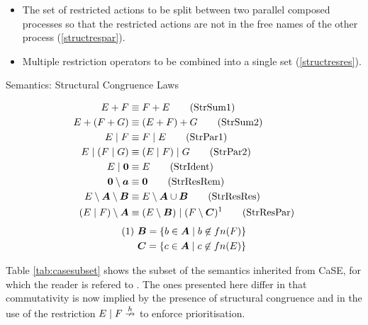 \documentclass[orivec,envcountsame]{llncs}
\begin{document}
\begin{itemize}
\item The set of restricted actions to be split between two parallel
      composed processes so that the restricted actions are not in the
      free names of the other process \textsf{(\ref{structrespar})}.
\item Multiple restriction operators to be combined into a single set
      \textsf{(\ref{structresres})}.
\end{itemize}

\begin{table}
  \caption{Semantics: Structural Congruence Laws}
 \label{tab:structcong}
 \vspace{-3mm}
  \shrule
  \begin{align}
   E + F & \equiv F + E \tag{StrSum1} \label{structsum1}
  \\
   E + (F + G) & \equiv (E + F) + G \tag{StrSum2} \label{structsum2}
   \\
    E \pc F & \equiv F \pc E \tag{StrPar1} \label{structpar1}
  \\
   E \pc (F \pc G) & \equiv (E \pc F) \pc G \tag{StrPar2} \label{structpar2}
 \\
    E \pc \nil & \equiv E \tag{StrIdent} \label{structident}
   \\
    \nil \setminus \vec{a} & \equiv \nil \tag{StrResRem}
   \label{structresremove}
   \\
    E \setminus \vec{A} \setminus \vec{B} & \equiv E \setminus \vec{A} \cup \vec{B}
   \tag{StrResRes} \label{structresres}
   \\
    (E \pc F) \setminus \vec{A} & \equiv (E \setminus \vec{B}) \pc (F
   \setminus \vec{C})^1 \tag{StrResPar} \label{structrespar}
\end{align}
\begin{align} 
   (1)\ & \vec{B} = \{b \in \vec{A} \pc b \not \in fn(F)\} \notag \\ 
   & \vec{C} = \{c \in \vec{A} \pc c \not \in fn(E)\} \notag
 \end{align} 
  \shrule
\end{table}

Table \ref{tab:casesubset} shows the subset of the semantics inherited
from CaSE, for which the reader is refered to \cite{case}.  The ones
presented here differ in that commutativity is now implied by the
presence of structural congruence and in the use of the restriction $E
\;|\; F \stackrel{h}{\nrightarrow}$ to enforce prioritisation.
\end{document}
